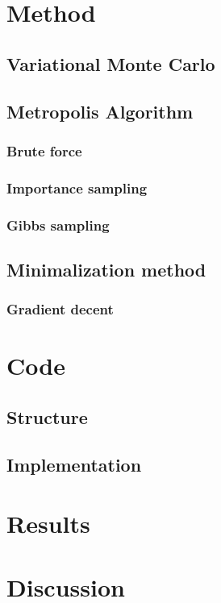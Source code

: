 \documentclass[norsk,a4paper,12pt]{article}
\begin{document}
\section{Method}

\subsection{Variational Monte Carlo}
\subsection{Metropolis Algorithm}
\subsubsection{Brute force}
\subsubsection{Importance sampling}
\subsubsection{Gibbs sampling}

\subsection{Minimalization method}
\subsubsection{Gradient decent}

\section{Code}
\subsection{Structure}
\subsection{Implementation}

\section{Results} \label{sec:Results}

\section{Discussion} \label{sec:Discussion}
\end{document}
